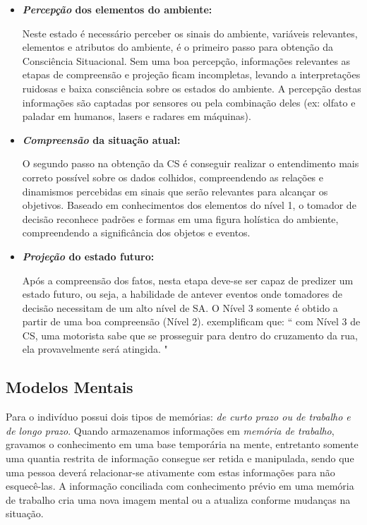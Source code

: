\documentclass[12pt]{article}
\begin{document}
\begin{itemize}
		
	\item \textbf{\textit{Percepção} dos elementos do ambiente:}
	
	Neste estado é necessário perceber os sinais do ambiente, variáveis relevantes, elementos e atributos do ambiente, é o primeiro passo para obtenção da Consciência Situacional. Sem uma boa percepção, informações relevantes as etapas de compreensão e projeção ficam incompletas, levando a interpretações ruidosas e baixa consciência sobre os estados do ambiente. A percepção destas informações são captadas por sensores ou pela combinação deles (ex: olfato e paladar em humanos, lasers e radares em máquinas).
	
	\item  \textbf{\textit{Compreensão} da situação atual:}
	
	O segundo passo na obtenção da CS é conseguir realizar o entendimento mais correto possível sobre os dados colhidos, compreendendo as relações e dinamismos percebidas em sinais que serão relevantes para alcançar os objetivos. Baseado em conhecimentos dos elementos do nível 1, o tomador de decisão reconhece padrões e formas em uma figura holística do ambiente, compreendendo a significância dos objetos e eventos.	
	
	\item \textbf{\textit{Projeção} do estado futuro:}
	
	Após a compreensão dos fatos, nesta etapa deve-se ser capaz de predizer um estado futuro, ou seja, a habilidade de antever eventos onde tomadores de decisão necessitam de um alto nível de SA. O Nível 3 somente é obtido a partir de uma boa compreensão (Nível 2). \cite{Endsley2012} exemplificam que: `` com Nível 3 de CS, uma motorista sabe que se prosseguir para dentro do cruzamento da rua, ela provavelmente será atingida. "
	
\end{itemize}

\subsection{Modelos Mentais}

Para \cite{Endsley2012} o indivíduo  possui dois tipos de memórias: \textit{de curto prazo ou de trabalho e de longo prazo}. Quando armazenamos informações em \textit{memória de trabalho}, gravamos o conhecimento em uma base temporária na mente, entretanto somente uma quantia restrita de informação consegue ser retida e manipulada, sendo que uma pessoa deverá relacionar-se ativamente com estas informações para não esquecê-las. A informação conciliada com conhecimento prévio em uma memória de trabalho cria uma nova imagem mental ou a atualiza conforme mudanças na situação. 	
\end{document}
